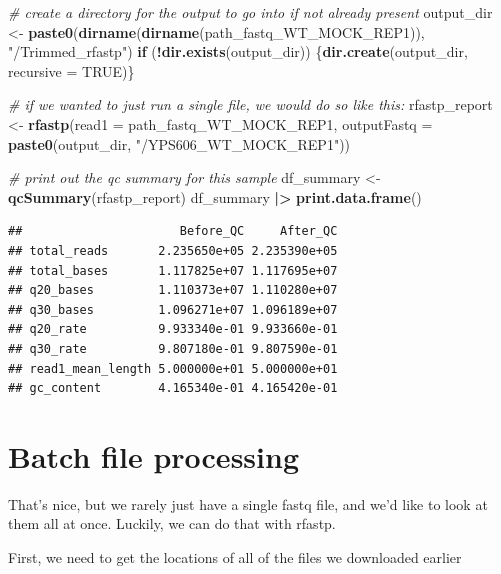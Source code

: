 \documentclass[
]{book}
\newenvironment{Shaded}{\begin{snugshade}}{\end{snugshade}}
\newcommand{\AttributeTok}[1]{\textcolor[rgb]{0.13,0.29,0.53}{#1}}
\newcommand{\CommentTok}[1]{\textcolor[rgb]{0.56,0.35,0.01}{\textit{#1}}}
\newcommand{\ConstantTok}[1]{\textcolor[rgb]{0.56,0.35,0.01}{#1}}
\newcommand{\ControlFlowTok}[1]{\textcolor[rgb]{0.13,0.29,0.53}{\textbf{#1}}}
\newcommand{\FunctionTok}[1]{\textcolor[rgb]{0.13,0.29,0.53}{\textbf{#1}}}
\newcommand{\NormalTok}[1]{#1}
\newcommand{\OtherTok}[1]{\textcolor[rgb]{0.56,0.35,0.01}{#1}}
\newcommand{\SpecialCharTok}[1]{\textcolor[rgb]{0.81,0.36,0.00}{\textbf{#1}}}
\newcommand{\StringTok}[1]{\textcolor[rgb]{0.31,0.60,0.02}{#1}}
\begin{document}
\begin{Shaded}
\begin{Highlighting}[]
\CommentTok{\# create a directory for the output to go into if not already present}
\NormalTok{output\_dir }\OtherTok{\textless{}{-}} \FunctionTok{paste0}\NormalTok{(}\FunctionTok{dirname}\NormalTok{(}\FunctionTok{dirname}\NormalTok{(path\_fastq\_WT\_MOCK\_REP1)), }\StringTok{"/Trimmed\_rfastp"}\NormalTok{) }
\ControlFlowTok{if}\NormalTok{ (}\SpecialCharTok{!}\FunctionTok{dir.exists}\NormalTok{(output\_dir)) \{}\FunctionTok{dir.create}\NormalTok{(output\_dir, }\AttributeTok{recursive =} \ConstantTok{TRUE}\NormalTok{)\}}

\CommentTok{\# if we wanted to just run a single file, we would do so like this:}
\NormalTok{rfastp\_report }\OtherTok{\textless{}{-}} \FunctionTok{rfastp}\NormalTok{(}\AttributeTok{read1 =}\NormalTok{ path\_fastq\_WT\_MOCK\_REP1,}
                        \AttributeTok{outputFastq =} \FunctionTok{paste0}\NormalTok{(output\_dir, }\StringTok{"/YPS606\_WT\_MOCK\_REP1"}\NormalTok{))}

\CommentTok{\# print out the qc summary for this sample}
\NormalTok{df\_summary }\OtherTok{\textless{}{-}} \FunctionTok{qcSummary}\NormalTok{(rfastp\_report)}
\NormalTok{df\_summary }\SpecialCharTok{|\textgreater{}} \FunctionTok{print.data.frame}\NormalTok{()}
\end{Highlighting}
\end{Shaded}

\begin{verbatim}
##                      Before_QC     After_QC
## total_reads       2.235650e+05 2.235390e+05
## total_bases       1.117825e+07 1.117695e+07
## q20_bases         1.110373e+07 1.110280e+07
## q30_bases         1.096271e+07 1.096189e+07
## q20_rate          9.933340e-01 9.933660e-01
## q30_rate          9.807180e-01 9.807590e-01
## read1_mean_length 5.000000e+01 5.000000e+01
## gc_content        4.165340e-01 4.165420e-01
\end{verbatim}

\hypertarget{batch-file-processing}{%
\section{Batch file processing}\label{batch-file-processing}}

That's nice, but we rarely just have a single fastq file, and we'd like to look at them all at once. Luckily, we can do that with rfastp.

First, we need to get the locations of all of the files we downloaded earlier
\end{document}
